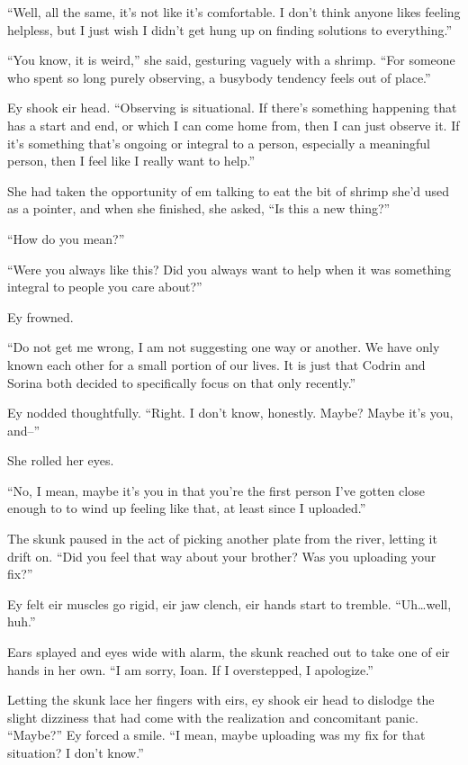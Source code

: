 ``Well, all the same, it's not like it's comfortable. I don't think anyone likes feeling helpless, but I just wish I didn't get hung up on finding solutions to everything.''

``You know, it is weird,'' she said, gesturing vaguely with a shrimp. ``For someone who spent so long purely observing, a busybody tendency feels out of place.''

Ey shook eir head. ``Observing is situational. If there's something happening that has a start and end, or which I can come home from, then I can just observe it. If it's something that's ongoing or integral to a person, especially a meaningful person, then I feel like I really want to help.''

She had taken the opportunity of em talking to eat the bit of shrimp she'd used as a pointer, and when she finished, she asked, ``Is this a new thing?''

``How do you mean?''

``Were you always like this? Did you always want to help when it was something integral to people you care about?''

Ey frowned.

``Do not get me wrong, I am not suggesting one way or another. We have only known each other for a small portion of our lives. It is just that Codrin and Sorina both decided to specifically focus on that only recently.''

Ey nodded thoughtfully. ``Right. I don't know, honestly. Maybe? Maybe it's you, and--''

She rolled her eyes.

``No, I mean, maybe it's you in that you're the first person I've gotten close enough to to wind up feeling like that, at least since I uploaded.''

The skunk paused in the act of picking another plate from the river, letting it drift on. ``Did you feel that way about your brother? Was you uploading your fix?''

Ey felt eir muscles go rigid, eir jaw clench, eir hands start to tremble. ``Uh\ldots well, huh.''

Ears splayed and eyes wide with alarm, the skunk reached out to take one of eir hands in her own. ``I am sorry, Ioan. If I overstepped, I apologize.''

Letting the skunk lace her fingers with eirs, ey shook eir head to dislodge the slight dizziness that had come with the realization and concomitant panic. ``Maybe?'' Ey forced a smile. ``I mean, maybe uploading was my fix for that situation? I don't know.''

